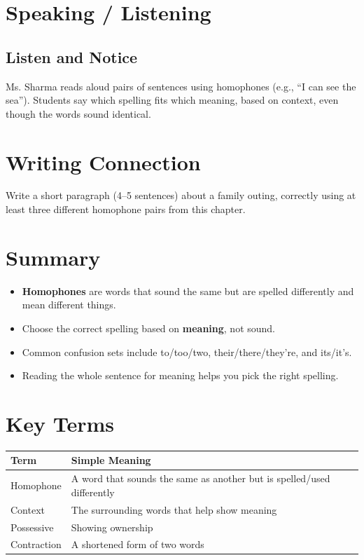\section{Speaking / Listening}
\subsection*{Listen and Notice}
Ms. Sharma reads aloud pairs of sentences using homophones (e.g., ``I can see the sea''). Students say which spelling fits which meaning, based on context, even though the words sound identical.

\section{Writing Connection}
Write a short paragraph (4--5 sentences) about a family outing, correctly using at least three different homophone pairs from this chapter.

\section{Summary}
\begin{summarybox}
\begin{itemize}
    \item \textbf{Homophones} are words that sound the same but are spelled differently and mean different things.
    \item Choose the correct spelling based on \textbf{meaning}, not sound.
    \item Common confusion sets include to/too/two, their/there/they're, and its/it's.
    \item Reading the whole sentence for meaning helps you pick the right spelling.
\end{itemize}
\end{summarybox}

\section{Key Terms}
\begin{table}[h!]
\centering
\begin{tabular}{|l|l|}
\hline
\textbf{Term} & \textbf{Simple Meaning} \\
\hline
Homophone & A word that sounds the same as another but is spelled/used differently \\
Context & The surrounding words that help show meaning \\
Possessive & Showing ownership \\
Contraction & A shortened form of two words \\
\hline
\end{tabular}
\end{table}

